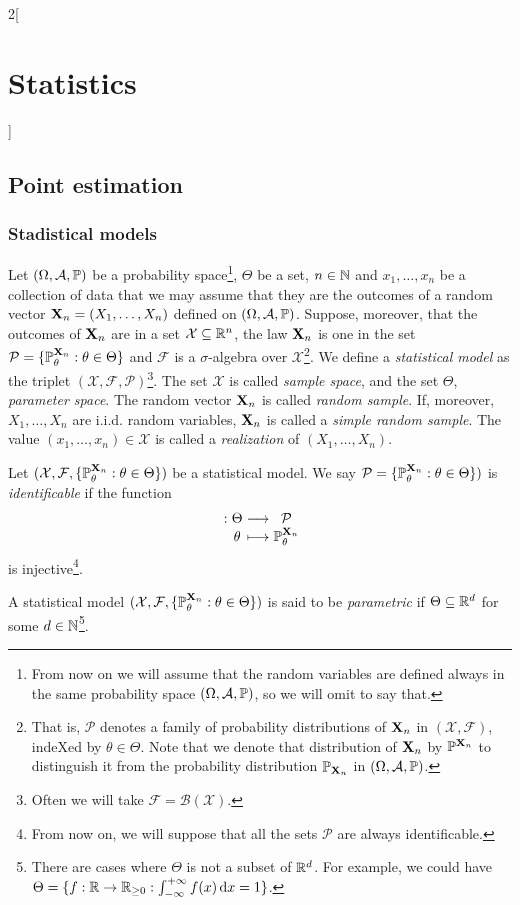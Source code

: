 \documentclass[../../../main.tex]{subfiles}
\begin{document}
\begin{multicols}{2}[\section{Statistics}]
  \subsection{Point estimation}
  \subsubsection{Stadistical models}
  \begin{definition}
    Let $(\Omega,\mathcal{A},\mathbb{P})$ be a probability space\footnote{From now on we will assume that the random variables are defined always in the same probability space $(\Omega,\mathcal{A},\mathbb{P})$, so we will omit to say that.}, $\Theta$ be a set, $n\in\mathbb{N}$ and $x_1,\ldots,x_n$ be a collection of data that we may assume that they are the outcomes of a random vector $\boldsymbol{\mathrm{X}}_n=(X_1,\ldots,X_n)$ defined on $(\Omega,\mathcal{A},\mathbb{P})$. Suppose, moreover, that the outcomes of $\boldsymbol{\mathrm{X}}_n$ are in a set $\mathcal{X}\subseteq\mathbb{R}^n$, the law $\boldsymbol{\mathrm{X}}_n$ is one in the set $\mathcal{P}=\{\mathbb{P}_\theta^{\boldsymbol{\mathrm{X}}_n}:\theta\in\Theta\}$ and $\mathcal{F}$ is a $\sigma$-algebra over $\mathcal{X}$\footnote{That is, $\mathcal{P}$ denotes a family of probability distributions of $\boldsymbol{\mathrm{X}}_n$ in $(\mathcal{X},\mathcal{F})$, indeXed by $\theta\in\Theta$. Note that we denote that distribution of $\boldsymbol{\mathrm{X}}_n$ by $\mathbb{P}^{\boldsymbol{\mathrm{X}}_n}$ to distinguish it from the probability distribution $\mathbb{P}_{\boldsymbol{\mathrm{X}}_n}$ in $(\Omega,\mathcal{A},\mathbb{P})$.}. We define a \emph{statistical model} as the triplet $(\mathcal{X},\mathcal{F},\mathcal{P})$\footnote{Often we will take $\mathcal{F}=\mathcal{B}(\mathcal{X})$.}. The set $\mathcal{X}$ is called \emph{sample space}, and the set $\Theta$, \emph{parameter space}. The random vector $\boldsymbol{\mathrm{X}}_n$ is called \emph{random sample}. If, moreover, $X_1,\ldots,X_n$ are i.i.d. random variables, $\boldsymbol{\mathrm{X}}_n$ is called a \emph{simple random sample}. The value $(x_1,\ldots,x_n)\in\mathcal{X}$ is called a \emph{realization} of $(X_1,\ldots,X_n)$.
  \end{definition}
  \begin{definition}
    Let $(\mathcal{X},\mathcal{F},\{\mathbb{P}_\theta^{\boldsymbol{\mathrm{X}}_n}:\theta\in\Theta\})$ be a statistical model. We say $\mathcal{P}=\{\mathbb{P}_\theta^{\boldsymbol{\mathrm{X}}_n}:\theta\in\Theta\})$ is \emph{identificable} if the function $$\function{}{\Theta}{\mathcal{P}}{\theta}{\Prob_\theta^{\vf{X}_n}}$$ is injective\footnote{From now on, we will suppose that all the sets $\mathcal{P}$ are always identificable.}.
  \end{definition}
  \begin{definition}
    A statistical model $(\mathcal{X},\mathcal{F},\{\mathbb{P}_\theta^{\boldsymbol{\mathrm{X}}_n}:\theta\in\Theta\})$ is said to be \emph{parametric} if $\Theta\subseteq \mathbb{R}^d$ for some $d\in\mathbb{N}$\footnote{There are cases where $\Theta$ is not a subset of $\mathbb{R}^d$. For example, we could have $\Theta=\{f:\mathbb{R}\rightarrow\mathbb{R}_{\geq 0} : \int_{-\infty}^{+\infty}f(x)\dd{x}=1\}$.}.
  \end{definition}

\end{multicols}
\end{document}
